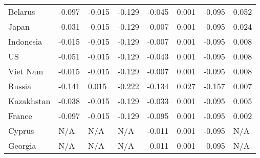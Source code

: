 \documentclass[utf8]{FrontiersinHarvard} %
\begin{document}
\begin{table}[h!]
\begin{tabularx}{\textwidth}{|l|X|X|X|X|X|X|X|}
		Belarus          & -0.097               & -0.015                         & -0.129                         & -0.045                 & 0.001                            & -0.095                           & 0.052                   \\
		Japan            & -0.031               & -0.015                         & -0.129                         & -0.007                 & 0.001                            & -0.095                           & 0.024                   \\
		Indonesia        & -0.015               & -0.015                         & -0.129                         & -0.007                 & 0.001                            & -0.095                           & 0.008                   \\
		US               & -0.051               & -0.015                         & -0.129                         & -0.043                 & 0.001                            & -0.095                           & 0.008                   \\
		Viet Nam         & -0.015               & -0.015                         & -0.129                         & -0.007                 & 0.001                            & -0.095                           & 0.008                   \\
		Russia           & -0.141               & 0.015                          & -0.222                         & -0.134                 & 0.027                            & -0.157                           & 0.007                   \\
		Kazakhstan       & -0.038               & -0.015                         & -0.129                         & -0.033                 & 0.001                            & -0.095                           & 0.005                   \\
		France           & -0.097               & -0.015                         & -0.129                         & -0.095                 & 0.001                            & -0.095                           & 0.002                   \\
		Cyprus           & N/A                  & N/A                            & N/A                            & -0.011                 & 0.001                            & -0.095                           & N/A                     \\
		Georgia          & N/A                  & N/A                            & N/A                            & -0.011                 & 0.001                            & -0.095                           & N/A                     \\

\end{tabularx}
\end{table}
\end{document}
